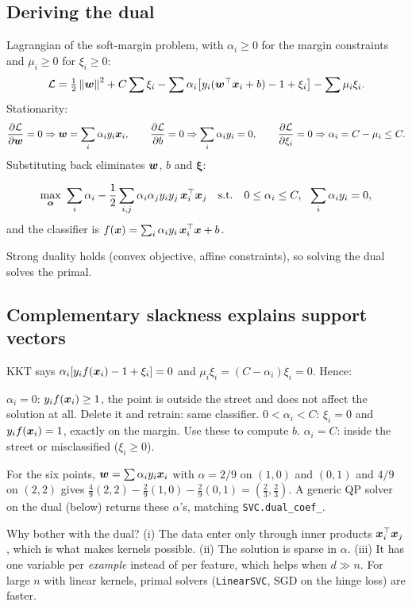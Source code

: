 \subsection{Deriving the dual}
Lagrangian of the soft-margin problem, with $\alpha_i\ge0$ for the margin constraints and
$\mu_i\ge0$ for $\xi_i\ge0$:
\[ \mathcal{L}=\tfrac12\left\lVert {\bm{w}} \right\rVert^2+C\sum\xi_i-\sum\alpha_i\bigl[y_i({\bm{w}}^{\top}{\bm{x}}_i+b)-1+\xi_i\bigr]-\sum\mu_i\xi_i. \]
Stationarity:
\[ \frac{\partial \mathcal{L}}{\partial {\bm{w}}}=0\Rightarrow{\bm{w}}=\sum_i\alpha_iy_i{\bm{x}}_i,\qquad
	\frac{\partial \mathcal{L}}{\partial b}=0\Rightarrow\sum_i\alpha_iy_i=0,\qquad
	\frac{\partial \mathcal{L}}{\partial \xi_i}=0\Rightarrow\alpha_i=C-\mu_i\le C. \]
Substituting back eliminates ${\bm{w}}$, $b$ and $\bm\xi$:
\begin{theorem}
	\[ \max_{\balpha}\ \sum_i\alpha_i-\frac12\sum_{i,j}\alpha_i\alpha_jy_iy_j\,\x_i\T\x_j
		\quad\text{s.t.}\quad 0\le\alpha_i\le C,\ \ \sum_i\alpha_iy_i=0, \]
	and the classifier is $f({\bm{x}})=\sum_i\alpha_iy_i\,{\bm{x}}_i^{\top}{\bm{x}}+b$.
\end{theorem}
Strong duality holds (convex objective, affine constraints), so solving the dual solves the primal.

\subsection{Complementary slackness explains support vectors}
KKT says $\alpha_i[y_if({\bm{x}}_i)-1+\xi_i]=0$ and $\mu_i\xi_i=(C-\alpha_i)\xi_i=0$. Hence:
\begin{itemize}
	\ii $\alpha_i=0$: $y_if({\bm{x}}_i)\ge1$, the point is outside the street and does not affect the
	solution at all. Delete it and retrain: same classifier.
	\ii $0<\alpha_i<C$: $\xi_i=0$ and $y_if({\bm{x}}_i)=1$, exactly on the margin. Use these to compute $b$.
	\ii $\alpha_i=C$: inside the street or misclassified ($\xi_i\ge0$).
\end{itemize}
For the six points, ${\bm{w}}=\sum\alpha_iy_i{\bm{x}}_i$ with $\alpha=2/9$ on $(1,0)$ and $(0,1)$ and $4/9$ on
$(2,2)$ gives $\frac49(2,2)-\frac29(1,0)-\frac29(0,1)=(\frac23,\frac23)$. A generic QP solver on the
dual (below) returns these $\alpha$'s, matching \texttt{SVC.dual\_coef\_}.

\begin{remark}
	Why bother with the dual? (i) The data enter only through inner products ${\bm{x}}_i^{\top}{\bm{x}}_j$, which is
	what makes kernels possible. (ii) The solution is sparse in $\alpha$. (iii) It has one variable
	per \emph{example} instead of per feature, which helps when $d\gg n$. For large $n$ with linear
	kernels, primal solvers (\texttt{LinearSVC}, SGD on the hinge loss) are faster.
\end{remark}

